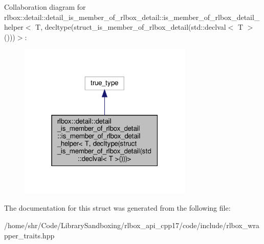 Collaboration diagram for rlbox\+:\+:detail\+:\+:detail\+\_\+is\+\_\+member\+\_\+of\+\_\+rlbox\+\_\+detail\+:\+:is\+\_\+member\+\_\+of\+\_\+rlbox\+\_\+detail\+\_\+helper$<$ T, decltype(struct\+\_\+is\+\_\+member\+\_\+of\+\_\+rlbox\+\_\+detail(std\+:\+:declval$<$ T $>$()))$>$\+:\nopagebreak
\begin{figure}[H]
\begin{center}
\leavevmode
\includegraphics[width=235pt]{structrlbox_1_1detail_1_1detail__is__member__of__rlbox__detail_1_1is__member__of__rlbox__detail_338d0c4a83c58365a9c650d6cbd26600}
\end{center}
\end{figure}


The documentation for this struct was generated from the following file\+:\begin{DoxyCompactItemize}
\item 
/home/shr/\+Code/\+Library\+Sandboxing/rlbox\+\_\+api\+\_\+cpp17/code/include/rlbox\+\_\+wrapper\+\_\+traits.\+hpp\end{DoxyCompactItemize}
